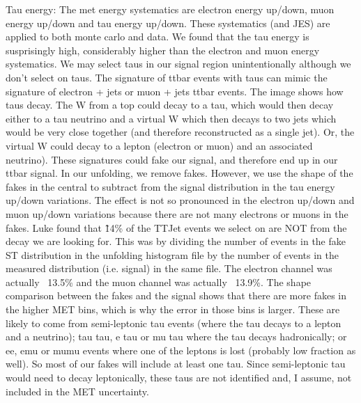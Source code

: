 Tau energy: The met energy systematics are electron energy up/down, muon energy up/down and tau energy
up/down. These systematics (and JES) are applied to both monte carlo and data. We found that the tau energy is
susprisingly high, considerably higher than the electron and muon energy systematics. We may select taus in
our signal region unintentionally although we don't select on taus. The signature of ttbar events with taus
can mimic the signature of electron + jets or muon + jets ttbar events. The image shows how taus decay. The W
from a top could decay to a tau, which would then decay either to a tau neutrino and a virtual W which then
decays to two jets which would be very close together (and therefore reconstructed as a single jet). Or, the
virtual W could decay to a lepton (electron or muon) and an associated neutrino). These signatures could fake
our signal, and therefore end up in our ttbar signal. In our unfolding, we remove fakes. However, we use the
shape of the fakes in the central to subtract from the signal distribution in the tau energy up/down
variations. The effect is not so pronounced in the electron up/down and muon up/down variations because there
are not many electrons or muons in the fakes. Luke found that \~14\% of the TTJet events we select on are NOT
from the decay we are looking for. This was by dividing the number of events in the fake ST distribution in
the unfolding histogram file by the number of events in the measured distribution (i.e. signal) in the same
file. The electron channel was actually ~13.5\% and the muon channel was actually ~13.9\%. The shape
comparison between the fakes and the signal shows that there are more fakes in the higher MET bins, which is
why the error in those bins is larger. These are likely to come from semi-leptonic tau events (where the tau
decays to a lepton and a neutrino); tau tau, e tau or mu tau where the tau decays hadronically; or ee, emu or
mumu events where one of the leptons is lost (probably low fraction as well). So most of our fakes will
include at least one tau. Since semi-leptonic tau would need to decay leptonically, these taus are not
identified and, I assume, not included in the MET uncertainty.

